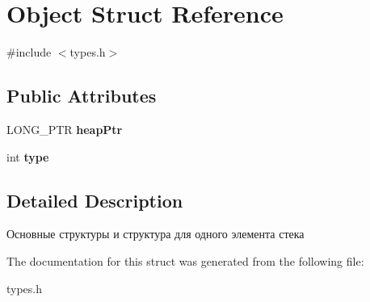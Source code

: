 \hypertarget{struct_object}{}\section{Object Struct Reference}
\label{struct_object}


{\ttfamily \#include $<$types.\+h$>$}

\subsection*{Public Attributes}
\begin{DoxyCompactItemize}
\item 
\mbox{\label{struct_object_a57c2788ebc3793ff75fc814efe166f08}} 
L\+O\+N\+G\+\_\+\+P\+TR {\bfseries heap\+Ptr}
\item 
\mbox{\label{struct_object_a63af4a55e2e4b6b6b8227c435f7237fb}} 
int {\bfseries type}
\end{DoxyCompactItemize}


\subsection{Detailed Description}
Основные структуры и структура для одного элемента стека 

The documentation for this struct was generated from the following file\+:\begin{DoxyCompactItemize}
\item 
types.\+h\end{DoxyCompactItemize}
